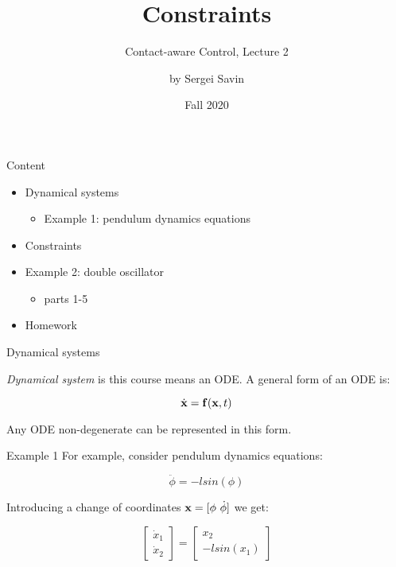 \documentclass{beamer}
\title{Constraints}
\subtitle{Contact-aware Control, Lecture 2}
\author{by Sergei Savin}
\date{Fall 2020}
\begin{document}
\maketitle


\begin{frame}{Content}

\begin{itemize}
\item Dynamical systems
\begin{itemize}
\item Example 1: pendulum dynamics equations
\end{itemize}
\item Constraints
\item Example 2: double oscillator
\begin{itemize}
\item parts 1-5
\end{itemize}
\item Homework
\end{itemize}

\end{frame}



\begin{frame}{Dynamical systems}
\begin{flushleft}

\emph{Dynamical system} is this course means an ODE. A general form of an ODE is:

\begin{equation}
    \dot{\mathbf{x}} = \mathbf{f}(\mathbf{x}, t) 
\end{equation}

Any ODE non-degenerate can be represented in this form. 

\begin{exampleblock}{Example 1}
For example, consider pendulum dynamics equations:

\begin{equation}
    \ddot{\phi} = -l sin(\phi) 
\end{equation}

Introducing a change of coordinates $\mathbf{x} = [\phi \ \dot{\phi}]$ we get:

\begin{equation}
    \begin{bmatrix} \dot{x}_1 \\ \dot{x}_2 \end{bmatrix} = 
    \begin{bmatrix} x_2 \\ -l sin(x_1) \end{bmatrix} 
\end{equation}

\end{exampleblock}

\end{flushleft}
\end{frame}
\end{document}
